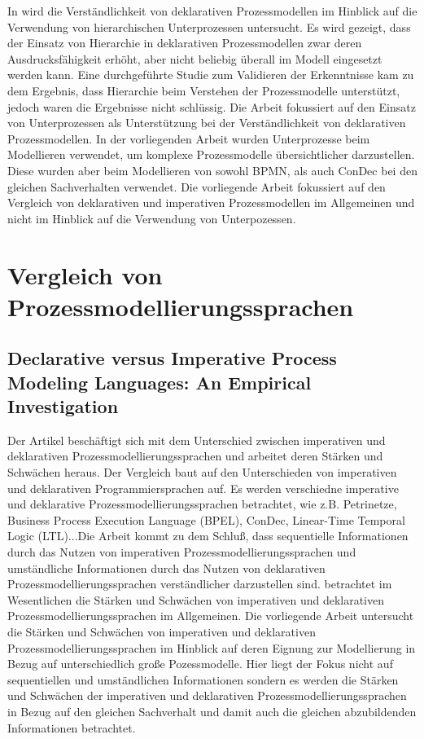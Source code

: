 In \cite{sabrina942} wird die Verständlichkeit von deklarativen Prozessmodellen im Hinblick auf die Verwendung von hierarchischen Unterprozessen untersucht. Es wird gezeigt, dass der Einsatz von Hierarchie in deklarativen Prozessmodellen zwar deren Ausdrucksfähigkeit erhöht, aber nicht beliebig überall im Modell eingesetzt werden kann. Eine durchgeführte Studie zum Validieren der Erkenntnisse kam zu dem Ergebnis, dass Hierarchie beim Verstehen der Prozessmodelle unterstützt, jedoch waren die Ergebnisse nicht schlüssig.\newline
Die Arbeit  \cite{sabrina942} fokussiert auf den Einsatz von Unterprozessen als Unterstützung bei der Verständlichkeit von deklarativen Prozessmodellen. In der vorliegenden Arbeit wurden Unterprozesse beim Modellieren verwendet, um komplexe Prozessmodelle übersichtlicher darzustellen. Diese wurden  aber beim Modellieren von sowohl BPMN, als auch ConDec bei den gleichen Sachverhalten verwendet. Die vorliegende Arbeit fokussiert auf den Vergleich von deklarativen und imperativen Prozessmodellen im Allgemeinen und nicht im Hinblick auf die Verwendung von Unterpozessen. \newline


\section{Vergleich von Prozessmodellierungssprachen}

\subsection{Declarative versus Imperative Process Modeling Languages: An Empirical Investigation}

Der Artikel \cite{fahland2009} beschäftigt sich mit dem Unterschied zwischen imperativen und deklarativen Prozessmodellierungssprachen und arbeitet deren Stärken und Schwächen heraus. Der Vergleich baut auf den Unterschieden von imperativen und deklarativen Programmiersprachen auf. Es werden verschiedne imperative und deklarative Prozessmodellierungssprachen betrachtet, wie z.B. Petrinetze, Business Process Execution Language (BPEL), ConDec, Linear-Time Temporal Logic (LTL)...Die Arbeit kommt zu dem Schluß, dass sequentielle Informationen durch das Nutzen von imperativen Prozessmodellierungssprachen und umständliche Informationen durch das Nutzen von deklarativen Prozessmodellierungssprachen verständlicher darzustellen sind.\newline
\cite{fahland2009} betrachtet im Wesentlichen die Stärken und Schwächen von imperativen und deklarativen Prozessmodellierungssprachen im Allgemeinen. Die vorliegende Arbeit untersucht die Stärken und Schwächen von imperativen und deklarativen Prozessmodellierungssprachen im Hinblick auf deren Eignung zur Modellierung in Bezug auf unterschiedlich große Pozessmodelle. Hier liegt der Fokus nicht auf sequentiellen und umständlichen Informationen sondern es werden die Stärken und Schwächen der imperativen und deklarativen Prozessmodellierungssprachen in Bezug auf den gleichen Sachverhalt und damit auch die gleichen abzubildenden Informationen betrachtet.\newline



